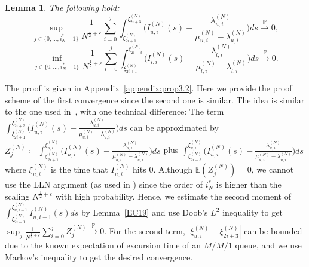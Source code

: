 \documentclass[11pt, reqno]{article}
\newtheorem{lemma}[theorem]{Lemma}
\numberwithin{equation}{section}
\numberwithin{theorem}{section}
\newcommand{\pto}{\ensuremath{\xrightarrow{\ \mathbb{P}\ }}}  %
\newcommand{\E}{\mathbb{E}}                 %
\begin{document}
\begin{lemma}\label{M/M/1 behavior}
The following hold:
$$\sup_{j\in\{0,...,i^*_N-1\}}\frac{1}{N^{\frac{1}{2}+\varepsilon}}\sum_{i=0}^j\int_{\xi^{(N)}_{2i+1}}^{\xi^{(N)}_{2i+3}}\Big(I^{(N)}_{u,i}(s)-\frac{\lambda^{(N)}_{u,i}}{\mu^{(N)}_{u,i}-\lambda^{(N)}_{u,i}}\Big)ds\pto0,$$
$$\inf_{j\in\{0,...,i^*_N-1\}}\frac{1}{N^{\frac{1}{2}+\varepsilon}}\sum_{i=0}^j\int_{\xi^{(N)}_{2i+1}}^{\xi^{(N)}_{2i+3}}\Big(I^{(N)}_{l,i}(s)-\frac{\lambda^{(N)}_{l,i}}{\mu^{(N)}_{l,i}-\lambda^{(N)}_{l,i}}\Big)ds\pto0.$$
\end{lemma}
The proof is given in Appendix~\ref{appendix:prop3.2}.
Here we provide the proof scheme of the first convergence since the second one is similar. 
The idea is similar to the one used in~\cite{GW19}, with one technical difference: The term
$\int_{\xi^{(N)}_{2i+1}}^{\xi^{(N)}_{2i+3}}\Big(I^{(N)}_{u,i}(s)-\frac{\lambda^{(N)}_{u,i}}{\mu^{(N)}_{u,i}-\lambda^{(N)}_{u,i}}\Big)ds$ can be approximated by $Z^{(N)}_j\coloneqq\int_{\xi^{(N)}_{2i+1}}^{\xi^{(N)}_{u,i}}\Big(I^{(N)}_{u,i}(s)-\frac{\lambda^{(N)}_{u,i}}{\mu^{(N)}_{u,i}-\lambda^{(N)}_{u,i}}\Big)ds$ 
plus 
$\int^{\xi^{(N)}_{u,i}}_{\xi^{(N)}_{2i+3}}\Big(I^{(N)}_{u,i}(s)-\frac{\lambda^{(N)}_{u,i}}{\mu^{(N)}_{u,i}-\lambda^{(N)}_{u,i}}\Big)ds$ where $\xi^{(N)}_{u,i}$ is the time that $I^{(N)}_{u,i}$ hits 0. 
Although $\E(Z^{(N)}_j)=0$, we cannot use the LLN argument (as used in \cite{GW19}) since the order of $i^*_N$ is higher than the scaling $N^{\frac{1}{2}+\varepsilon}$ with high probability. 
Hence, we estimate the second moment of $\int_{\xi^{(N)}_{2i-1}}^{\xi^{(N)}_{u,i-1}}I^{(N)}_{u,i-1}(s)ds$ by Lemma~\ref{EC19} and use Doob's $L^2$ inequality to get $\sup_j\frac{1}{N^{\frac{1}{2}+\varepsilon}}\sum_{i=0}^jZ^{(N)}_j\pto0$. 
For the second term, $|\xi^{(N)}_{u,i}-\xi^{(N)}_{2i+3}|$ can be bounded due to the known expectation of excursion time of an $M/M/1$ queue, and we use Markov's inequality to get the desired convergence.
\end{document}
